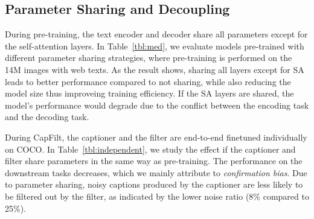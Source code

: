 



\vspace{-0.5ex}
\subsection{Parameter Sharing and Decoupling}
\vspace{-0.5ex}



During pre-training, the text encoder and decoder share all parameters except for the self-attention layers.
In Table~\ref{tbl:med},
we evaluate models pre-trained with different parameter sharing strategies,
where pre-training is performed on the 14M images with web texts.
As the result shows,
sharing all layers except for SA leads to better performance compared to not sharing,
while also reducing the model size thus improveing training efficiency.
If the SA layers are shared, the model's performance would degrade due to the conflict between the encoding task and the decoding task. 

During CapFilt,
the captioner and the filter are end-to-end finetuned individually on COCO.
In Table~\ref{tbl:independent},
we study the effect if the captioner and filter share parameters in the same way as pre-training.
The performance on the downstream tasks decreases,
which we mainly attribute to \textit{confirmation bias}.
Due to parameter sharing,
noisy captions produced by the captioner are less likely to be filtered out by the filter, as indicated by the lower noise ratio (8\% compared to 25\%).






